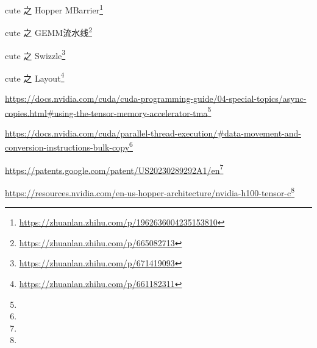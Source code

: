 cute 之 Hopper MBarrier\footnote{\url{https://zhuanlan.zhihu.com/p/1962636004235153810}}

cute 之 GEMM流水线\footnote{\url{https://zhuanlan.zhihu.com/p/665082713}}

cute 之 Swizzle\footnote{\url{https://zhuanlan.zhihu.com/p/671419093}}

cute 之 Layout\footnote{\url{https://zhuanlan.zhihu.com/p/661182311}}

\url{https://docs.nvidia.com/cuda/cuda-programming-guide/04-special-topics/async-copies.html#using-the-tensor-memory-accelerator-tma}\footnote{\reedIXurlA}

\url{https://docs.nvidia.com/cuda/parallel-thread-execution/#data-movement-and-conversion-instructions-bulk-copy}\footnote{\reedIXurlB}

\url{https://patents.google.com/patent/US20230289292A1/en}\footnote{\reedIXurlC}

\url{https://resources.nvidia.com/en-us-hopper-architecture/nvidia-h100-tensor-c}\footnote{\reedIXurlD}
